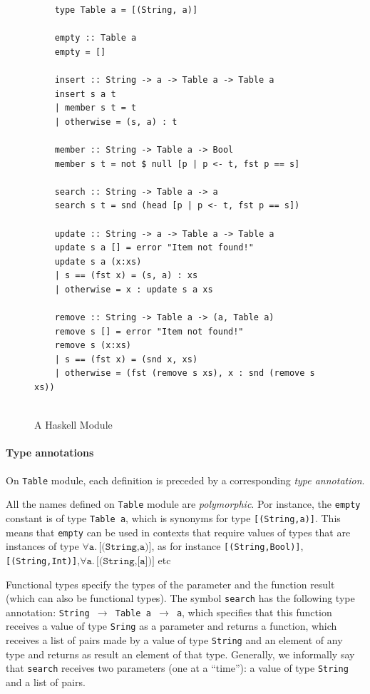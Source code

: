\documentclass[oneside,12pt]{scrbook}
\theoremstyle{definition}
\theoremstyle{plain}
\theoremstyle{definition}
\begin{document}
\begin{figure}
	\begin{verbatim}
	type Table a = [(String, a)]
	
	empty :: Table a
	empty = []
	
	insert :: String -> a -> Table a -> Table a
	insert s a t
	| member s t = t
	| otherwise = (s, a) : t
	
	member :: String -> Table a -> Bool
	member s t = not $ null [p | p <- t, fst p == s]
	
	search :: String -> Table a -> a
	search s t = snd (head [p | p <- t, fst p == s])
	
	update :: String -> a -> Table a -> Table a
	update s a [] = error "Item not found!"
	update s a (x:xs)
	| s == (fst x) = (s, a) : xs
	| otherwise = x : update s a xs
	
	remove :: String -> Table a -> (a, Table a)
	remove s [] = error "Item not found!"
	remove s (x:xs)
	| s == (fst x) = (snd x, xs)
	| otherwise = (fst (remove s xs), x : snd (remove s xs))
	
	\end{verbatim}
	\caption{A Haskell Module}
	\label{fig:haskell}
\end{figure}

\paragraph{Type annotations}

On \texttt{Table} module, each definition is preceded by a corresponding \emph{type annotation}.

All the names defined on \texttt{Table} module are \emph{polymorphic}. Por instance, the \texttt{empty} constant is of type \texttt{Table a}, which is synonyms for type \texttt{[(String,a)]}. This means that \texttt{empty} can be used in contexts that require values of types that are instances of type $\forall\texttt{a.$\,$[(String,a)]}$, as for instance \texttt{[(String,Bool)]}, \texttt{[(String,Int)]},\linebreak$\forall\texttt{a.$\,$[(String,[a])]}$ etc

Functional types specify the types of the parameter and the function result (which can also be functional types). The symbol \texttt{search} has the following type annotation: \texttt{String $\rightarrow$ Table a $\rightarrow$ a}, which specifies that this function receives a value of type \texttt{Sring} as a parameter and returns a function, which receives a list of pairs made by a value of type \texttt{String} and an element of any type and returns as result an element of that type. Generally, we informally say that \texttt{search} receives two parameters (one at a ``time''): a value of type \texttt{String} and a list of pairs.
\end{document}
